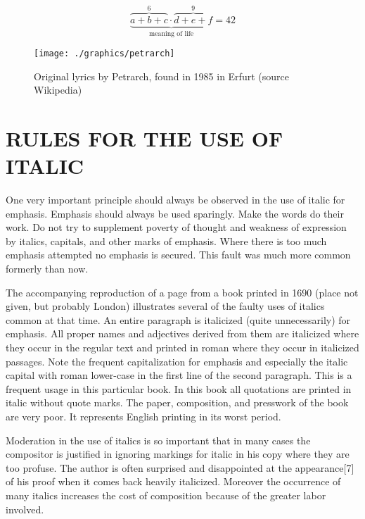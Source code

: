 \[\underbrace{\overbrace{a+b+c}^6
\cdot \overbrace{d+e+f}^9}
_\text{meaning of life} = 42\]

\begin{figure}
\texttt{[image: ./graphics/petrarch]}
\caption{Original lyrics by Petrarch, found in 1985 in Erfurt (source Wikipedia)}
\end{figure}

\chapter{RULES FOR THE USE OF ITALIC}
\setlength{\imagewidth}{0.33\textwidth}
One very important principle should always be observed in the use of italic for emphasis. Emphasis should always be used sparingly. Make the words do their work. Do not try to supplement poverty of thought and weakness of expression by italics, capitals, and other marks of emphasis. Where there is too much emphasis attempted no emphasis is secured. This fault was much more common formerly than now.

The accompanying reproduction of a page from a book printed in 1690 (place not given, but probably London) illustrates several of the faulty uses of italics common at that time. An entire paragraph is italicized (quite unnecessarily) for emphasis. All proper names and adjectives derived from them are italicized where they occur in the regular text and printed in roman where they occur in italicized passages. Note the frequent capitalization for emphasis and especially the italic capital with roman lower-case in the first line of the second paragraph. This is a frequent usage in this particular book. In this book all quotations are printed in italic without quote marks. The paper, composition, and presswork of the book are very poor. It represents English printing in its worst period.

Moderation in the use of italics is so important that in many cases the compositor is justified in ignoring markings for italic in his copy where they are too profuse. The author is often surprised and disappointed at the appearance[7] of his proof when it comes back heavily italicized. Moreover the occurrence of many italics increases the cost of composition because of the greater labor involved.

